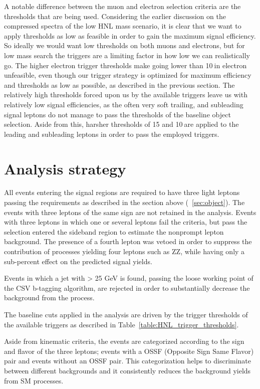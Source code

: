 A notable difference between the muon and electron selection criteria
are the \pt thresholds that are being used. Considering the earlier
discussion on the compressed \pt spectra of the low HNL mass scenario, it is
clear that we want to apply \pt thresholds as low as feasible in order
to gain the maximum signal efficiency. So ideally we would want low
\pt thresholds on both muons and electrons, but for low mass search the triggers are a
limiting factor in how low we can realistically go. The higher
electron trigger thresholds make going lower than 10\GeV $\:$in electron \pt unfeasible, even though our trigger strategy is
optimized for maximum efficiency and thresholds as low as possible, as
described in the previous section. The relatively high \pt thresholds forced upon us by the available
triggers leave us with relatively low signal efficiencies, as the
often very soft trailing, and subleading signal leptons do not manage
to pass the thresholds of the baseline object selection.
 Aside from this, harsher \pt thresholds of 15 and 10\GeV $\:$are applied
 to the leading and subleading leptons in order to pass the employed
 triggers.

\section{Analysis strategy}\label{sec:analisi}
All events entering the signal regions are required to have three light leptons passing the \ti requirements as described in the section above (~\ref{sec:object}).
The events with three leptons of the same sign are not retained in the analysis. 
Events with three leptons in which one or several leptons fail the \ti
criteria, but pass the \fo selection entered the sideband region to estimate the nonprompt lepton background. The presence of a fourth \fo lepton was vetoed in order to suppress the contribution of processes yielding four leptons such as ZZ, while having only a sub-percent effect on the predicted signal yields.

Events in which a jet with \pt > 25 GeV is found, passing the loose working point of the CSV b-tagging algorithm, are rejected in order to substantially decrease the background from the \ttbar process. 

The baseline \pt cuts applied in the analysis are driven by the
trigger thresholds of the available triggers as described in
Table~\ref{table:HNL_trigger_thresholds}.

Aside from kinematic criteria, the events
are categorized according to the sign and flavor of the three
leptons; events with a OSSF (Opposite Sign Same Flavor) pair and
events without an OSSF pair. This categorization helps to discriminate between
different backgrounds and it consistently reduces the background yields
from SM processes.

